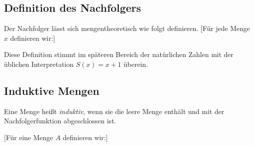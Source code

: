 \documentclass[main.tex]{subfiles}
\begin{document}
\subsection{Definition des Nachfolgers}

Der Nachfolger lässt sich mengentheoretisch wie folgt definieren.  
[Für jede Menge \(x\) definieren wir:]
\begin{remark}
Diese Definition stimmt im späteren Bereich der natürlichen Zahlen mit der üblichen Interpretation \(S(x) = x+1\) überein. 

\end{remark}
\subsection{Induktive Mengen}

Eine Menge heißt \emph{induktiv}, wenn sie die leere Menge enthält und mit der Nachfolgerfunktion abgeschlossen ist.

[Für eine Menge \(A\) definieren wir:]


\begin{tabproof}
\end{tabproof}

\begin{tabproof}
\end{tabproof}

\begin{tabproof}
\end{tabproof}
\end{document}
